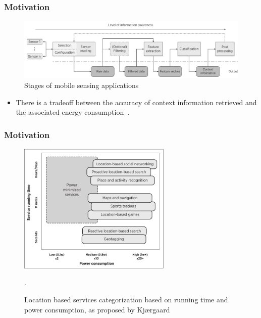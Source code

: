 \documentclass[compress,9pt,xcolor={dvipsnames,table}]{beamer}
\begin{document}
\begin{frame}\frametitle{Motivation}
\begin{figure}[tb]
  \centering
  \includegraphics[width=\textwidth]{../../../resources/images/vectors/msa-stages}
  \caption{Stages of mobile sensing applications}
  \label{fig:msa-stages}
\end{figure}

\begin{itemize}
  \item There is a tradeoff between the accuracy of context information retrieved and the associated energy consumption~\cite{Sim2014,Rachuri2012}.
\end{itemize}
\end{frame}


\begin{frame}\frametitle{Motivation}
\begin{figure}[tb]
  \centering
  \includegraphics[width=0.65\textwidth]{../../../resources/images/vectors/lbs-classification}
  \caption{Location based services categorization based on running time and power consumption, as proposed by Kj\ae rgaard~\cite{Kjaergaard2012}}.
  \label{fig:lbs-classification}
\end{figure}

\end{frame}
\end{document}
